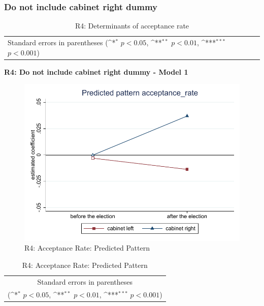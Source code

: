 \documentclass[10pt,a4paper]{scrartcl}
\begin{document}


\clearpage
\FloatBarrier
\subsubsection{Do not include cabinet right dummy}
\begin{table}[!ht]\centering
	\renewcommand{\arraystretch}{1.25}
	\small
	\def\sym#1{\ifmmode^{#1}\else\(^{#1}\)\fi}
	\caption{R4: Determinants of acceptance rate}
	\begin{tabular}{l*{3}{c}}
		\hline\hline
		
		\hline\hline
		\multicolumn{4}{l}{\footnotesize Standard errors in parentheses (\sym{*} \(p<0.05\), \sym{**} \(p<0.01\), \sym{***} \(p<0.001\))}\\
	\end{tabular}
\end{table}

\clearpage
\textbf{R4: Do not include cabinet right dummy - Model 1}
\begin{figure}[!ht]
	\centering
	\includegraphics[width=1\textwidth]{figures_edited/acceptance_rate_graph1_R4.pdf}
	\caption{R4: Acceptance Rate: Predicted Pattern}
\end{figure}

\begin{table}[!ht]\centering
	\renewcommand{\arraystretch}{1.25}
	\def\sym#1{\ifmmode^{#1}\else\(^{#1}\)\fi}
	\caption{R4: Acceptance Rate: Predicted Pattern}
	\begin{tabular}{l*{2}{c}}
		\hline\hline
		
		\hline\hline
		\multicolumn{3}{c}{\footnotesize Standard errors in parentheses} \\
		\multicolumn{3}{c}{\footnotesize (\sym{*} \(p<0.05\), \sym{**} \(p<0.01\), \sym{***} \(p<0.001\))}\\
	\end{tabular}
\end{table}
\end{document}
